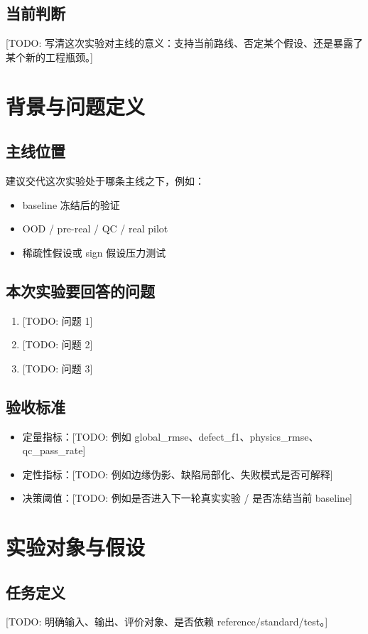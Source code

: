 \documentclass[UTF8,a4paper,11pt]{ctexart}
\newcommand{\TODO}[1]{\textcolor{red!70!black}{[TODO: #1]}}
\begin{document}
\subsection{当前判断}
\TODO{写清这次实验对主线的意义：支持当前路线、否定某个假设、还是暴露了某个新的工程瓶颈。}

\section{背景与问题定义}

\subsection{主线位置}
建议交代这次实验处于哪条主线之下，例如：
\begin{itemize}
  \item baseline 冻结后的验证
  \item OOD / pre-real / QC / real pilot
  \item 稀疏性假设或 sign 假设压力测试
\end{itemize}

\subsection{本次实验要回答的问题}
\begin{enumerate}
  \item \TODO{问题 1}
  \item \TODO{问题 2}
  \item \TODO{问题 3}
\end{enumerate}

\subsection{验收标准}
\begin{itemize}
  \item 定量指标：\TODO{例如 global\_rmse、defect\_f1、physics\_rmse、qc\_pass\_rate}
  \item 定性指标：\TODO{例如边缘伪影、缺陷局部化、失败模式是否可解释}
  \item 决策阈值：\TODO{例如是否进入下一轮真实实验 / 是否冻结当前 baseline}
\end{itemize}

\section{实验对象与假设}

\subsection{任务定义}
\TODO{明确输入、输出、评价对象、是否依赖 reference/standard/test。}
\end{document}
